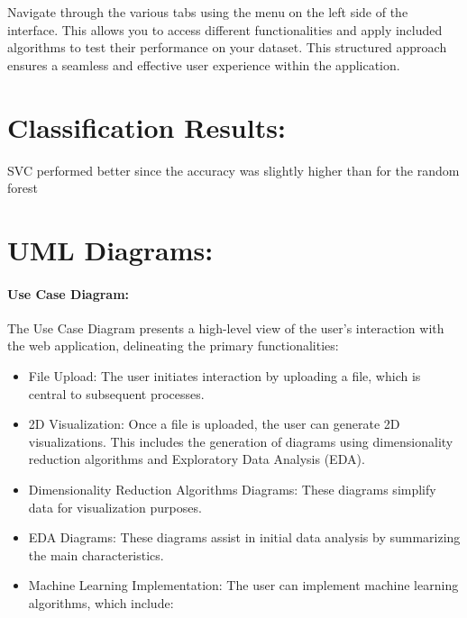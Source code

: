 \documentclass[unnumsec,webpdf,contemporary,large]{oup-authoring-template}%
\theoremstyle{thmstyleone}%
\theoremstyle{thmstyletwo}%
\theoremstyle{thmstylethree}%
\begin{document}
Navigate through the various tabs using the menu on the left side of the interface. This allows you to access different functionalities and apply included algorithms to test their performance on your dataset. This structured approach ensures a seamless and effective user experience within the application.


\section{Classification Results:}\label{sec3}
\vspace{0.2cm}

SVC performed better since the accuracy was slightly higher than for the random forest
\vspace{0.2cm}

\section{UML Diagrams:}\label{sec3}
\vspace{0.2cm}

\paragraph{Use Case Diagram:}
\vspace{0.2cm}

The Use Case Diagram presents a high-level view of the user's interaction with the web application, delineating the primary functionalities:
\vspace{0.2cm}

\begin{itemize}
    \item File Upload: The user initiates interaction by uploading a file, which is central to subsequent processes.
    \vspace{0.2cm}
    \item 2D Visualization: Once a file is uploaded, the user can generate 2D visualizations. This includes the generation of diagrams using dimensionality reduction algorithms and Exploratory Data Analysis (EDA).
    \vspace{0.2cm}
    \item Dimensionality Reduction Algorithms Diagrams: These diagrams simplify data for visualization purposes.
    \vspace{0.2cm}
    \item EDA Diagrams: These diagrams assist in initial data analysis by summarizing the main characteristics.
    \vspace{0.2cm}
    \item Machine Learning Implementation: The user can implement machine learning algorithms, which include:
\end{itemize}
\end{document}
